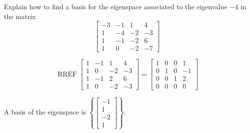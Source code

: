 
\begin{exerciseStatement}


Explain how to find a basis for the eigenspace associated to the eigenvalue \( -4 \) in the matrix \[ \left[\begin{array}{cccc}
-3 & -1 & 1 & 4 \\
1 & -4 & -2 & -3 \\
1 & -1 & -2 & 6 \\
1 & 0 & -2 & -7
\end{array}\right] \]


\end{exerciseStatement}
    
\begin{exerciseAnswer} 


\[\operatorname{RREF} \left[\begin{array}{cccc}
1 & -1 & 1 & 4 \\
1 & 0 & -2 & -3 \\
1 & -1 & 2 & 6 \\
1 & 0 & -2 & -3
\end{array}\right] = \left[\begin{array}{cccc}
1 & 0 & 0 & 1 \\
0 & 1 & 0 & -1 \\
0 & 0 & 1 & 2 \\
0 & 0 & 0 & 0
\end{array}\right] \]



A basis of the eigenspace is \( \left\{ \left[\begin{array}{c}
-1 \\
1 \\
-2 \\
1
\end{array}\right] \right\} \).


\end{exerciseAnswer}
    
